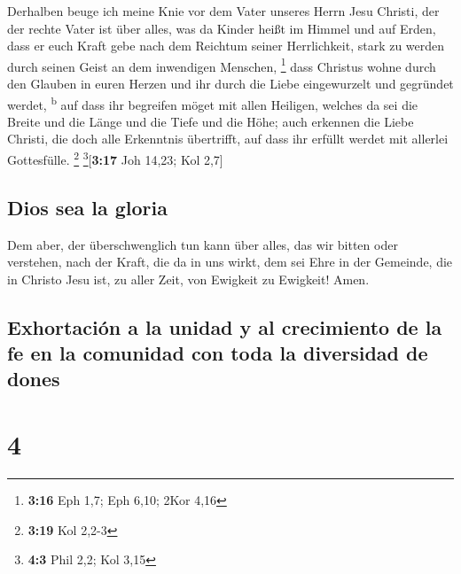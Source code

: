 Derhalben beuge ich meine Knie vor dem Vater unseres
Herrn Jesu Christi,  der der rechte Vater ist über alles,
was da Kinder heißt im Himmel und auf Erden,  dass er
euch Kraft gebe nach dem Reichtum seiner Herrlichkeit, stark zu werden
durch seinen Geist an dem inwendigen Menschen, \footnote{\textbf{3:16}
  Eph 1,7; Eph 6,10; 2Kor 4,16}  dass Christus wohne
durch den Glauben in euren Herzen und ihr durch die Liebe eingewurzelt
und gegründet werdet, \textsuperscript{b}  auf dass ihr
begreifen möget mit allen Heiligen, welches da sei die Breite und die
Länge und die Tiefe und die Höhe;  auch erkennen die
Liebe Christi, die doch alle Erkenntnis übertrifft, auf dass ihr erfüllt
werdet mit allerlei Gottesfülle. \footnote{\textbf{3:19} Kol 2,2-3}
\footnote{\textbf{4:3} Phil 2,2; Kol 3,15}{[}\textbf{3:17} Joh 14,23;
Kol 2,7{]}

\hypertarget{dios-sea-la-gloria}{%
\subsection{Dios sea la gloria}\label{dios-sea-la-gloria}}

 Dem aber, der überschwenglich tun kann über alles, das
wir bitten oder verstehen, nach der Kraft, die da in uns wirkt,
 dem sei Ehre in der Gemeinde, die in Christo Jesu ist,
zu aller Zeit, von Ewigkeit zu Ewigkeit! Amen.

\hypertarget{exhortaciuxf3n-a-la-unidad-y-al-crecimiento-de-la-fe-en-la-comunidad-con-toda-la-diversidad-de-dones}{%
\subsection{Exhortación a la unidad y al crecimiento de la fe en la
comunidad con toda la diversidad de
dones}\label{exhortaciuxf3n-a-la-unidad-y-al-crecimiento-de-la-fe-en-la-comunidad-con-toda-la-diversidad-de-dones}}

\hypertarget{section-3}{%
\section{4}\label{section-3}}

